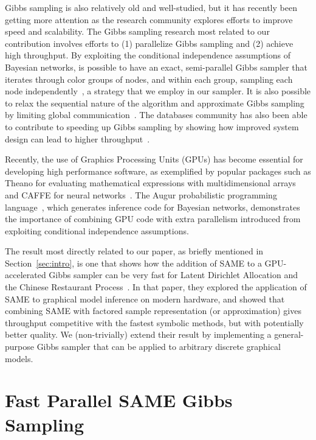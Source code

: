 \documentclass{article} %
\begin{document}
Gibbs sampling is also relatively old and well-studied, but it has recently been getting more
attention as the research community explores efforts to improve speed and scalability. The Gibbs
sampling research most related to our contribution involves efforts to (1) parallelize Gibbs
sampling and (2) achieve high throughput. By exploiting the conditional independence assumptions of
Bayesian networks, is possible to have an exact, semi-parallel Gibbs sampler that iterates through
color groups of nodes, and within each group, sampling each node independently~\citep{Gonzalez2011},
a strategy that we employ in our sampler. It is also possible to relax the sequential nature of the
algorithm and approximate Gibbs sampling by limiting global communication~\citep{Johnson2013}.  The
databases community has also been able to contribute to speeding up Gibbs sampling by showing how
improved system design can lead to higher throughput~\citep{Zhang2013}.

Recently, the use of Graphics Processing Units (GPUs) has become essential for developing high
performance software, as exemplified by popular packages such as Theano for evaluating mathematical
expressions with multidimensional arrays~\citep{Theano2012} and CAFFE for neural
networks~\citep{jia2014caffe}.  The Augur probabilistic programming language~\citep{Augur2014},
which generates inference code for Bayesian networks, demonstrates the importance of combining GPU
code with extra parallelism introduced from exploiting conditional independence assumptions.

The result most directly related to our paper, as briefly mentioned in Section~\ref{sec:intro}, is
one that shows how the addition of SAME to a GPU-accelerated Gibbs sampler can be very fast for
Latent Dirichlet Allocation and the Chinese Restaurant Process~\citep{SAME2015}. In that paper, they
explored the application of SAME to graphical model inference on modern hardware, and showed that
combining SAME with factored sample representation (or approximation) gives throughput competitive
with the fastest symbolic methods, but with potentially better quality. We (non-trivially) extend
their result by implementing a general-purpose Gibbs sampler that can be applied to arbitrary
discrete graphical models.





\section{Fast Parallel SAME Gibbs Sampling}\label{sec:same}
\end{document}
